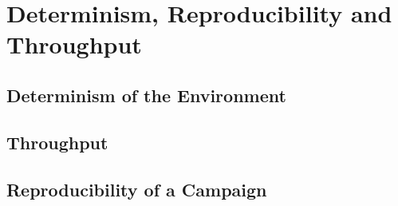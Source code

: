 
\section{Determinism, Reproducibility and Throughput}\label{sec:impl-reproducibility}


\subsection{Determinism of the Environment}\label{sec:platform-determinism}


\subsection{Throughput}\label{sec:platform-throughput}


\subsection{Reproducibility of a Campaign}\label{sec:impl-seeds}

%
